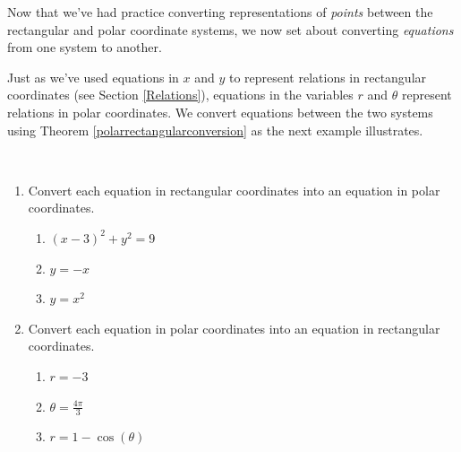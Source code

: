 \documentclass{ximera}
\begin{document}
 

Now that we've had practice converting representations of \textit{points} between the rectangular and polar coordinate systems, we now set about converting \textit{equations} from one system to another.  

 

Just as we've used equations in $x$ and $y$ to represent relations in rectangular coordinates (see Section \ref{Relations}), equations in the variables $r$ and $\theta$ represent relations in polar coordinates.  We convert equations between the two systems using Theorem \ref{polarrectangularconversion} as the next example illustrates.

 

\begin{example} \label{eqnconversionex} $~$

\begin{enumerate}

\item \label{recteqntopolar} Convert each equation in rectangular coordinates into an equation in polar coordinates.
\begin{enumerate}

\item  \label{ris6costheta} $(x-3)^2 + y^2 = 9$

\item  \label{yisnegx} $y = -x$

\item  \label{yisxsquared} $y = x^2$

\end{enumerate}

\item \label{polareqntorect} Convert each equation in polar coordinates into an equation in rectangular coordinates.

\begin{enumerate}

\item  \label{risneg3} $r = -3$

\item  $\theta = \frac{4\pi}{3}$

\item \label{cardioidtorect} $r = 1 - \cos(\theta)$

\end{enumerate}

\end{enumerate} 

\begin{explanation}


\end{explanation}
\end{example}
\end{document}
